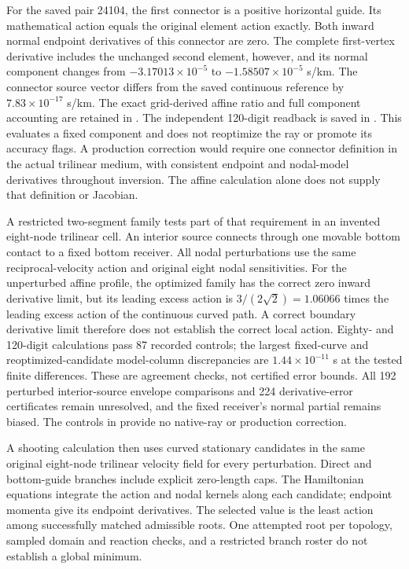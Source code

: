 For the saved pair 24104, the first connector is a positive horizontal guide.
Its mathematical action equals the original element action exactly. Both
inward normal endpoint derivatives of this connector are zero. The complete
first-vertex derivative includes the unchanged second element, however, and
its normal component changes from $-3.17013\times10^{-5}$ to
$-1.58507\times10^{-5}$ s/km. The connector source vector differs from the saved
continuous reference by $7.83\times10^{-17}$ s/km. The exact grid-derived
affine ratio and full component accounting are retained in
.
The independent 120-digit readback is saved in
.
This evaluates a fixed component and does not reoptimize the ray or promote
its accuracy flags. A production correction would require one connector
definition in the actual trilinear medium, with consistent endpoint and
nodal-model derivatives throughout inversion. The affine calculation alone
does not supply that definition or Jacobian.

A restricted two-segment family tests part of that requirement in an invented
eight-node trilinear cell. An interior source connects through one movable
bottom contact to a fixed bottom receiver. All nodal perturbations use the
same reciprocal-velocity action and original eight nodal sensitivities.
For the unperturbed affine profile, the optimized family has the correct
zero inward derivative limit, but its leading excess action is
$3/(2\sqrt{2})=1.06066$ times the leading excess action of the continuous
curved path. A correct
boundary derivative limit therefore does not establish the correct local
action. Eighty- and 120-digit calculations pass 87 recorded controls;
the largest fixed-curve and reoptimized-candidate model-column discrepancies
are $1.44\times10^{-11}$ s at the tested finite differences.
These are agreement checks, not certified error bounds. All 192 perturbed
interior-source envelope comparisons and 224 derivative-error certificates
remain unresolved, and the fixed receiver's normal partial remains biased.
The controls in
provide no native-ray or production correction.

A shooting calculation then uses curved stationary candidates in the same
original eight-node trilinear velocity field for every perturbation. Direct
and bottom-guide branches include explicit zero-length caps. The Hamiltonian
equations integrate the action and nodal kernels along each candidate; endpoint
momenta give its endpoint derivatives. The selected value is the least action
among successfully matched admissible roots. One attempted root per topology,
sampled domain and reaction checks, and a restricted branch roster do not
establish a global minimum.

